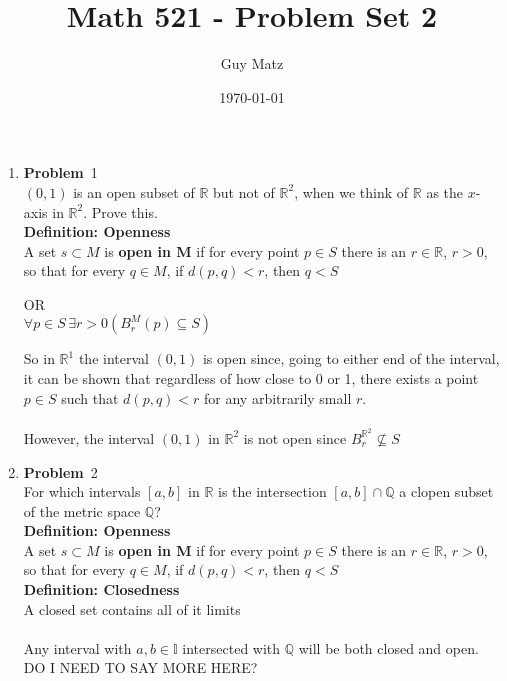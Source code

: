\documentclass[12pt]{amsart}
\title{\textbf{Math 521 - Problem Set 2}}
\author{Guy Matz}
\date{\today}
\theoremstyle{definition}
\newcommand{\mbR}{\mathbb{R}}
\newcommand{\mbQ}{\mathbb{Q}}
\newcommand{\mbI}{\mathbb{I}}
\newcommand{\itep}{\item {\bfseries Problem}\ }
\begin{document}
 

\maketitle
\newpage %

\begin{enumerate}[series=p]
\itep 1 \\
$(0, 1)$ is an open subset of $\mbR$ but not of $\mbR^2$, when we think of $\mbR$ as the $x$-axis in $\mbR^2$.  Prove this.
\\

\textbf{Definition: Openness}\\
	A set $s \subset M$ is \textbf{open in M} if for every point $p \in S$ there is an $r \in \mbR$, $r>0$, so that for every $q \in M$,
	if $d(p,q) < r$, then $q < S$
	\begin{center}
		OR
		\\
		$\forall p \in S \, \exists r > 0 (B_r^M(p) \subseteq S)$
	\end{center}
So in $\mbR^1$ the interval $(0,1)$ is open since, going to either end of the interval, it can be shown that regardless of how close to 0 or 1, there exists a point $p \in S$ such that $d(p,q) < r$ for any arbitrarily small $r$.
\\
\\
However, the interval $(0,1)$ in $\mbR^2$ is not open since $B_r^{\mbR^2} \nsubseteq S$

\newpage

\itep 2 \\
For which intervals $[a,b]$ in $\mbR$ is the intersection $[a,b] \cap \mbQ$ a clopen subset of the metric space $\mbQ$?
\\
\textbf{Definition: Openness}\\
A set $s \subset M$ is \textbf{open in M} if for every point $p \in S$ there is an $r \in \mbR$, $r>0$, so that for every $q \in M$,
if $d(p,q) < r$, then $q < S$
\\
\textbf{Definition: Closedness}\\
A closed set contains all of it limits\\
\\
Any interval with $a, b \in \mbI$ intersected with $\mbQ$ will be  both closed and open.  DO I NEED TO SAY MORE HERE?
\newpage


\end{enumerate}
\end{document}
